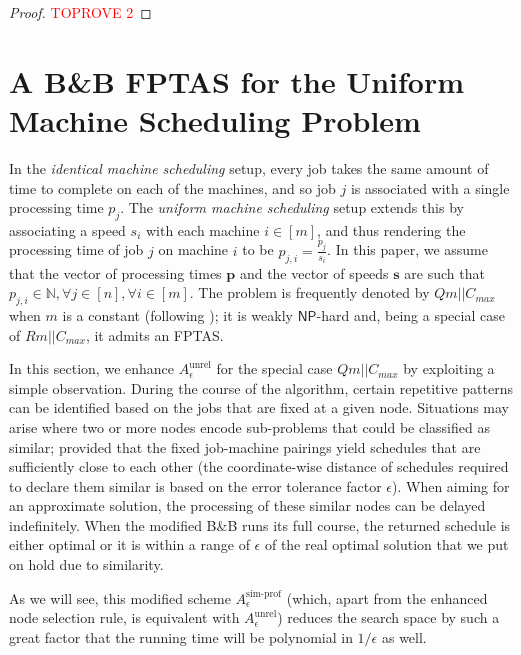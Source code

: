 \documentclass[a4paper,UKenglish,cleveref, autoref, thm-restate, pdfa]{lipics-v2021}
\theoremstyle{plain}
\begin{document}
\begin{proof}\textcolor{red}{TOPROVE 2}\end{proof}
 
\section{A B\&B FPTAS for the Uniform Machine Scheduling Problem}\label{sec:js:fptas}

In the \emph{identical machine scheduling} setup, every job takes the same amount of time to complete on each of the machines, and so job $j$ is associated with a single processing time $p_j$. The \emph{uniform machine scheduling} setup extends this by associating a speed $s_i$ with each machine $i \in [m]$, and thus rendering the processing time of job $j$ on machine $i$ to be $p_{j, i} = \frac{p_j}{s_i}$. In this paper, we assume that the vector of processing times $\bm{p}$ and the vector of speeds $\bm{s}$ are such that $p_{j,i} \in \mathbb{N}, \forall j \in [n], \forall i \in [m]$. The problem is frequently denoted by $Qm||C_{max}$ when $m$ is a constant (following \cite{machine_scheduling_review}); it is weakly $\mathsf{NP}$-hard and, being a special case of $Rm||C_{max}$, it admits an FPTAS.

In this section, we enhance $A^{\text{unrel}}_{\epsilon}$ for the special case $Qm||C_{max}$ by exploiting a simple observation. During the course of the algorithm, certain repetitive patterns can be identified based on the jobs that are fixed at a given node. Situations may arise where two or more nodes encode sub-problems that could be classified as similar; provided that the fixed job-machine pairings yield schedules that are sufficiently close to each other (the coordinate-wise distance of schedules required to declare them similar is based on the error tolerance factor $\epsilon$). When aiming for an approximate solution, the processing of these similar nodes can be delayed indefinitely. When the modified B\&B runs its full course, the returned schedule is either optimal or it is within a range of $\epsilon$ of the real optimal solution that we put on hold due to similarity.

As we will see, this modified scheme $A^{\text{sim-prof}}_{\epsilon}$ (which, apart from the enhanced node selection rule, is equivalent with $A^{\text{unrel}}_{\epsilon}$) reduces the search space by such a great factor that the running time will be polynomial in $1/\epsilon$ as well.

\fptas
\end{document}
